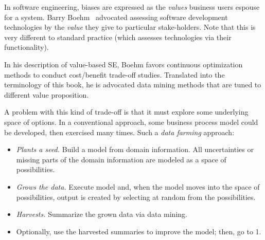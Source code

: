 \documentclass[table, xcdraw, sigconf,review, anonymous]{acmart}
\begin{document}
In software engineering, biases are expressed as the {\em values}
business users espouse for a system.
 Barry Boehm~\cite{boehm04}
advocated assessing
software development technologies
 by the {\em value} they give
to particular stake-holders. Note that this is
very different to standard practice (which assesses technologies
via their functionality).

In his description of value-based SE, Boehm favors
continuous optimization methods to  conduct cost/benefit
trade-off studies. Translated into the terminology
of this book, he is advocated data mining methods that are
tuned to different value proposition.

A problem with this kind of trade-off is that it must explore some
underlying space of options.  In a conventional approach, some
business process model could be developed, then exercised many
times. Such a {\em data farming} approach: 
\begin{itemize}
\item
{\em Plants a seed.} Build a model from domain information. All uncertainties or missing parts of the domain information are modeled as a space of possibilities.
\item {\em Grows the data.} Execute model and, when the model moves into the space of possibilities, output is created by selecting at random from the possibilities.
\item {\em Harvests.} Summarize the grown data via data mining.
\item Optionally, use the harvested summaries to improve the model;
  then, go to 1. 
\end{itemize}
  
\end{document}
